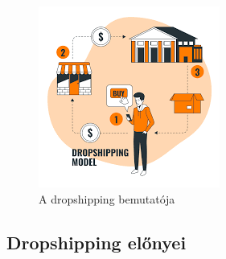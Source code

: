 \begin{figure}[h]
\centering
\includegraphics[scale=1.3]{images/dropshipping.png}
\caption{A dropshipping bemutatója \cite{22}}
\label{fig:dropshipping_modell}
\end{figure}

\subsection{Dropshipping előnyei}

